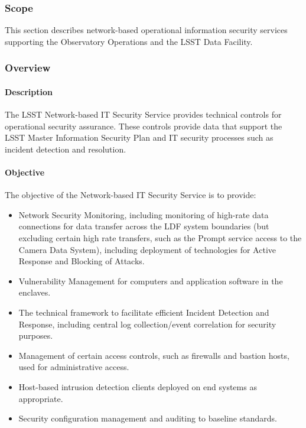 \subsubsection{Scope}

This section describes network-based operational information security services
supporting the Observatory Operations and the LSST Data Facility.

\subsubsection{Overview}

\paragraph{Description}

The LSST Network-based IT Security Service provides technical controls for
operational security assurance. These controls provide data that support the
LSST Master Information Security Plan and IT security processes such as incident
detection and resolution.

\paragraph{Objective}

The objective of the Network-based IT Security Service is to provide:

\begin{itemize}
\item Network Security Monitoring, including monitoring of high-rate data
connections for data transfer across the LDF system boundaries (but excluding
certain high rate transfers, such as the Prompt service access to the Camera
Data System), including deployment of technologies for Active Response and
Blocking of Attacks.
\item Vulnerability Management for computers and application software in the
enclaves.
\item The technical framework to facilitate efficient Incident Detection and
Response, including central log collection/event correlation for security purposes.
\item Management of certain access controls, such as firewalls and bastion hosts,
used for administrative access.
\item Host-based intrusion detection clients deployed on end systems as
appropriate.
\item Security configuration management and auditing to baseline standards.
\end{itemize}

